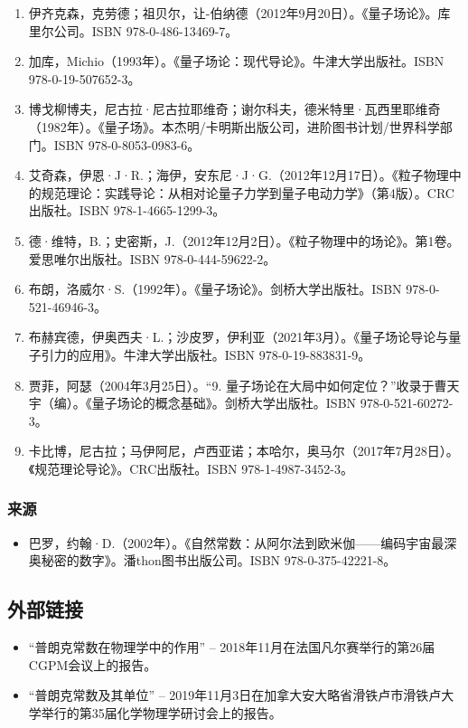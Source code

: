 \begin{enumerate}
\item 伊齐克森，克劳德；祖贝尔，让-伯纳德（2012年9月20日）。《量子场论》。库里尔公司。ISBN 978-0-486-13469-7。  
\item 加库，Michio（1993年）。《量子场论：现代导论》。牛津大学出版社。ISBN 978-0-19-507652-3。  
\item 博戈柳博夫，尼古拉·尼古拉耶维奇；谢尔科夫，德米特里·瓦西里耶维奇（1982年）。《量子场》。本杰明/卡明斯出版公司，进阶图书计划/世界科学部门。ISBN 978-0-8053-0983-6。
\item 艾奇森，伊恩·J·R.；海伊，安东尼·J·G.（2012年12月17日）。《粒子物理中的规范理论：实践导论：从相对论量子力学到量子电动力学》（第4版）。CRC出版社。ISBN 978-1-4665-1299-3。  
\item 德·维特，B.；史密斯，J.（2012年12月2日）。《粒子物理中的场论》。第1卷。爱思唯尔出版社。ISBN 978-0-444-59622-2。  
\item 布朗，洛威尔·S.（1992年）。《量子场论》。剑桥大学出版社。ISBN 978-0-521-46946-3。  
\item 布赫宾德，伊奥西夫·L.；沙皮罗，伊利亚（2021年3月）。《量子场论导论与量子引力的应用》。牛津大学出版社。ISBN 978-0-19-883831-9。  
\item 贾菲，阿瑟（2004年3月25日）。“9. 量子场论在大局中如何定位？”收录于曹天宇（编）。《量子场论的概念基础》。剑桥大学出版社。ISBN 978-0-521-60272-3。  
\item 卡比博，尼古拉；马伊阿尼，卢西亚诺；本哈尔，奥马尔（2017年7月28日）。《规范理论导论》。CRC出版社。ISBN 978-1-4987-3452-3。
\end{enumerate}
\subsubsection{来源}  
\begin{itemize}
\item 巴罗，约翰·D.（2002年）。《自然常数：从阿尔法到欧米伽——编码宇宙最深奥秘密的数字》。潘thon图书出版公司。ISBN 978-0-375-42221-8。
\end{itemize}
\subsection{外部链接}  
\begin{itemize}
\item “普朗克常数在物理学中的作用” – 2018年11月在法国凡尔赛举行的第26届CGPM会议上的报告。  
\item “普朗克常数及其单位” – 2019年11月3日在加拿大安大略省滑铁卢市滑铁卢大学举行的第35届化学物理学研讨会上的报告。
\end{itemize}